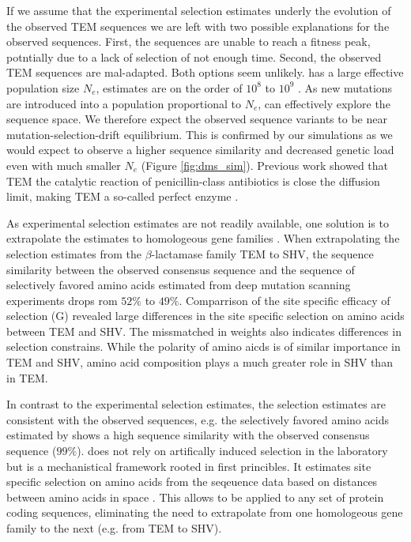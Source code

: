 \documentclass[12pt]{article}
\begin{document}

If we assume that the experimental selection estimates underly the evolution of the observed TEM sequences we are left with two possible explanations for the observed sequences.
First, the sequences are unable to reach a fitness peak, potntially due to a lack of selection of not enough time.
Second, the observed TEM sequences are mal-adapted.
Both options seem unlikely.
\ecoli has a large effective population size $N_e$, estimates are on the order of $10^8$ to $10^9$ \citep{OchmanAndWilson1987, hartl1994}.
As new mutations are introduced into a population proportional to $N_e$, \ecoli can effectively explore the sequence space.
We therefore expect the observed sequence variants to be near mutation-selection-drift equilibrium.
This is confirmed by our simulations as we would expect to observe a higher sequence similarity and decreased genetic load even with much smaller $N_e$ (Figure \ref{fig:dms_sim}).
Previous work showed that TEM the catalytic reaction of penicillin-class antibiotics is close the diffusion limit, making TEM a so-called perfect enzyme \citep{matagne1998}.

As experimental selection estimates are not readily available, one solution is to extrapolate the estimates to homologeous gene families \citep{bloom2014, bloom2017}.
When extrapolating the selection estimates from the $\beta$-lactamase family TEM to SHV, the sequence similarity between the observed consensus sequence and the sequence of selectively favored amino acids estimated from deep mutation scanning experiments drops rom $52 \% $ to $49 \%$.
Comparrison of the site specific efficacy of selection (G) revealed large differences in the site specific selection on amino acids between TEM and SHV.
The missmatched in \PC weights also indicates differences in selection constrains. 
While the polarity of amino aicds is of similar importance in TEM and SHV, amino acid composition plays a much greater role in SHV than in TEM.

In contrast to the experimental selection estimates, the \selac selection estimates are consistent with the observed sequences, e.g. the selectively favored amino acids estimated by \selac shows a high sequence similarity with the observed consensus sequence ($99 \%$).
\selac does not rely on artifically induced selection in the laboratory but is a mechanistical framework rooted in first princibles.
It estimates site specific selection on amino acids from the seqeuence data based on distances between amino acids in \PC space \citep{grantham1974,beaulieu2018}.
This allows \selac to be applied to any set of protein coding sequences, eliminating the need to extrapolate from one homologeous gene family to the next (e.g. from TEM to SHV).
\end{document}
